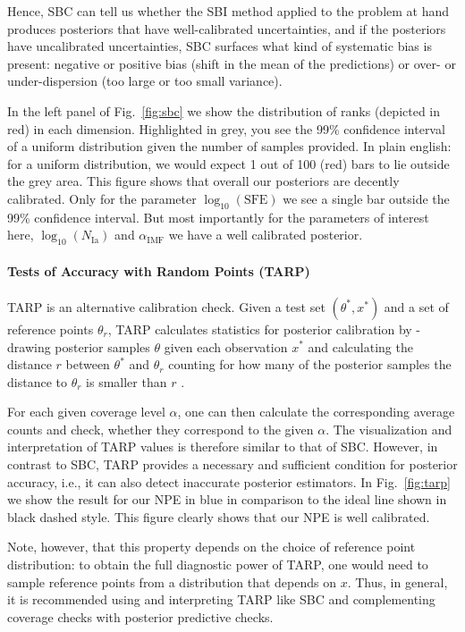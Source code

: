 \documentclass{aa}
\begin{document}
\begin{appendix}
Hence, SBC can tell us whether the SBI method applied to the problem at hand produces posteriors that have well-calibrated uncertainties, and if the posteriors have uncalibrated uncertainties, SBC surfaces what kind of systematic bias is present: negative or positive bias (shift in the mean of the predictions) or over- or under-dispersion (too large or too small variance).

In the left panel of Fig.~\ref{fig:sbc} we show the distribution of ranks (depicted in red) in each dimension. Highlighted in grey, you see the 99\% confidence interval of a uniform distribution given the number of samples provided. In plain english: for a uniform distribution, we would expect 1 out of 100 (red) bars to lie outside the grey area. This figure shows that overall our posteriors are decently calibrated. Only for the parameter $\log_{10}\left(\mathrm{SFE}\right)$ we see a single bar outside the 99\% confidence interval. But most importantly for the parameters of interest here, $\log_{10}\left(N_\mathrm{Ia}\right)$ and $\alpha_\mathrm{IMF}$ we have a well calibrated posterior.

\paragraph{Tests of Accuracy with Random Points (TARP)}

TARP \citep{Lemos2023} is an alternative calibration check. Given a test set $(\theta^*,x^*)$ and a set of reference points $\theta_r$, TARP calculates statistics for posterior calibration by - drawing posterior samples $\theta$ given each observation $x^*$ and calculating the distance $r$ between $\theta^*$ and $\theta_r$ counting for how many of the posterior samples the distance to $\theta_r$ is smaller than $r$ \citep[see e.g. Fig.~2 in][for an illustration]{Lemos2023}.

For each given coverage level $\alpha$, one can then calculate the corresponding average counts and check, whether they correspond to the given $\alpha$. The visualization and interpretation of TARP values is therefore similar to that of SBC. However, in contrast to SBC, TARP provides a necessary and sufficient condition for posterior accuracy, i.e., it can also detect inaccurate posterior estimators. In Fig.~\ref{fig:tarp} we show the result for our NPE in blue in comparison to the ideal line shown in black dashed style. This figure clearly shows that our NPE is well calibrated.

Note, however, that this property depends on the choice of reference point distribution: to obtain the full diagnostic power of TARP, one would need to sample reference points from a distribution that depends on $x$. Thus, in general, it is recommended using and interpreting TARP like SBC and complementing coverage checks with posterior predictive checks.

\end{appendix}
\end{document}
